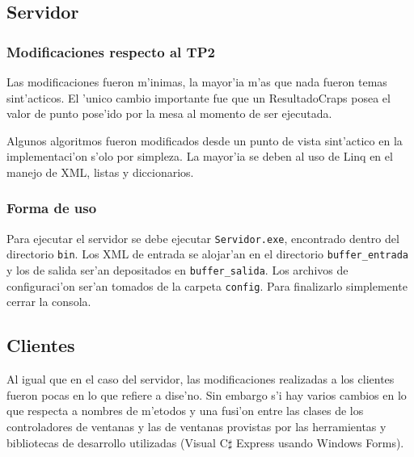 \subsection{Servidor}
\subsubsection{Modificaciones respecto al TP2}
Las modificaciones fueron m'inimas, la mayor'ia m'as que nada fueron temas sint'acticos. El 'unico cambio importante fue que un ResultadoCraps posea el valor de punto pose'ido por la mesa al momento de ser ejecutada.

Algunos algoritmos fueron modificados desde un punto de vista sint'actico en la implementaci'on s'olo por simpleza. La mayor'ia se deben al uso de Linq en el manejo de XML, listas y diccionarios.

\subsubsection{Forma de uso}
Para ejecutar el servidor se debe ejecutar \verb|Servidor.exe|, encontrado dentro del directorio \verb|bin|. Los XML de entrada se alojar'an en el directorio \verb|buffer_entrada| y los de salida ser'an depositados en \verb|buffer_salida|. Los archivos de configuraci'on ser'an tomados de la carpeta \verb|config|. Para finalizarlo simplemente cerrar la consola.

\subsection{Clientes}
Al igual que en el caso del servidor, las modificaciones realizadas a los clientes fueron pocas en lo que refiere a dise'no. Sin embargo s'i hay varios cambios en lo que respecta a nombres de m'etodos y una fusi'on entre las clases de los controladores de ventanas y las de ventanas provistas por las herramientas y bibliotecas de desarrollo utilizadas (Visual C$\sharp$ Express usando Windows Forms).

